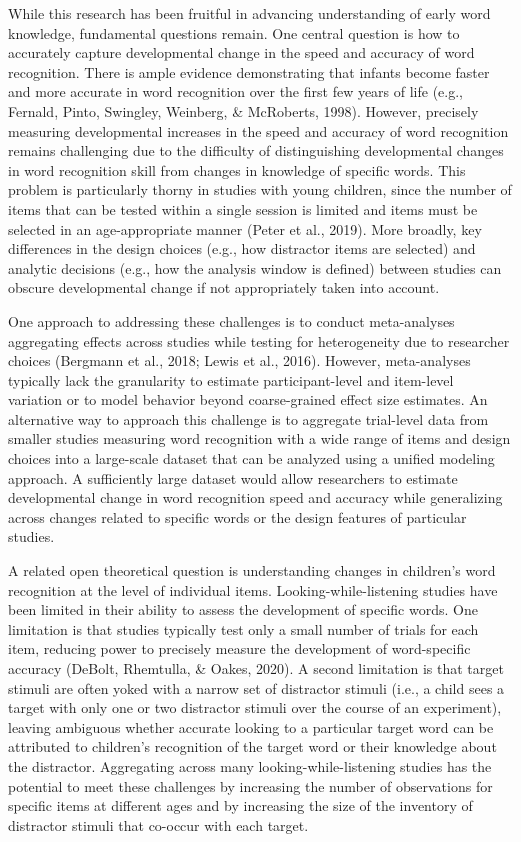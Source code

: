 \documentclass[
  english,
  man,floatsintext]{apa6}
\begin{document}
While this research has been fruitful in advancing understanding of early word knowledge, fundamental questions remain.
One central question is how to accurately capture developmental change in the speed and accuracy of word recognition.
There is ample evidence demonstrating that infants become faster and more accurate in word recognition over the first few years of life (e.g., Fernald, Pinto, Swingley, Weinberg, \& McRoberts, 1998).
However, precisely measuring developmental increases in the speed and accuracy of word recognition remains challenging due to the difficulty of distinguishing developmental changes in word recognition skill from changes in knowledge of specific words.
This problem is particularly thorny in studies with young children, since the number of items that can be tested within a single session is limited and items must be selected in an age-appropriate manner (Peter et al., 2019).
More broadly, key differences in the design choices (e.g., how distractor items are selected) and analytic decisions (e.g., how the analysis window is defined) between studies can obscure developmental change if not appropriately taken into account.

One approach to addressing these challenges is to conduct meta-analyses aggregating effects across studies while testing for heterogeneity due to researcher choices (Bergmann et al., 2018; Lewis et al., 2016).
However, meta-analyses typically lack the granularity to estimate participant-level and item-level variation or to model behavior beyond coarse-grained effect size estimates.
An alternative way to approach this challenge is to aggregate trial-level data from smaller studies measuring word recognition with a wide range of items and design choices into a large-scale dataset that can be analyzed using a unified modeling approach.
A sufficiently large dataset would allow researchers to estimate developmental change in word recognition speed and accuracy while generalizing across changes related to specific words or the design features of particular studies.

A related open theoretical question is understanding changes in children's word recognition at the level of individual items.
Looking-while-listening studies have been limited in their ability to assess the development of specific words.
One limitation is that studies typically test only a small number of trials for each item, reducing power to precisely measure the development of word-specific accuracy (DeBolt, Rhemtulla, \& Oakes, 2020).
A second limitation is that target stimuli are often yoked with a narrow set of distractor stimuli (i.e., a child sees a target with only one or two distractor stimuli over the course of an experiment), leaving ambiguous whether accurate looking to a particular target word can be attributed to children's recognition of the target word or their knowledge about the distractor.
Aggregating across many looking-while-listening studies has the potential to meet these challenges by increasing the number of observations for specific items at different ages and by increasing the size of the inventory of distractor stimuli that co-occur with each target.
\end{document}
